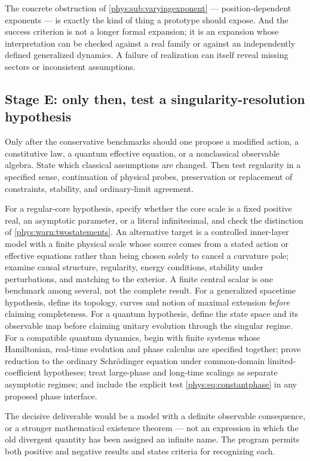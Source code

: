 \documentclass[11pt,letterpaper]{article}
\numberwithin{equation}{section}
\theoremstyle{definition}
\theoremstyle{remark}
\begin{document}
The concrete obstruction of \cref{phys:sub:varyingexponent} --- position-dependent
exponents --- is exactly the kind of thing a prototype should expose. And the
success criterion is not a longer formal expansion; it is an expansion whose
interpretation can be checked against a real family or against an independently
defined generalized dynamics. A failure of realization can itself reveal
missing sectors or inconsistent assumptions.

\subsection{Stage E: only then, test a singularity-resolution hypothesis}
\label{phys:sub:stageE}

Only after the conservative benchmarks should one propose a modified action, a
constitutive law, a quantum effective equation, or a nonclassical observable
algebra. State which classical assumptions are changed. Then test regularity in
a specified sense, continuation of physical probes, preservation or replacement
of constraints, stability, and ordinary-limit agreement.

For a regular-core hypothesis, specify whether the core scale is a fixed
positive real, an asymptotic parameter, or a literal infinitesimal, and check
the distinction of \cref{phys:warn:twostatements}. An alternative target is a
controlled inner-layer model with a finite physical scale whose source comes
from a stated action or effective equations rather than being chosen solely to
cancel a curvature pole; examine causal structure, regularity, energy
conditions, stability under perturbations, and matching to the exterior. A
finite central scalar is one benchmark among several, not the complete result.
For a generalized spacetime hypothesis, define its topology, curves and notion
of maximal extension \emph{before} claiming completeness. For a quantum
hypothesis, define the state space and its observable map before claiming
unitary evolution through the singular regime. For a compatible quantum
dynamics, begin with finite systems whose Hamiltonian, real-time evolution and
phase calculus are specified together; prove reduction to the ordinary
Schr\"odinger equation under common-domain limited-coefficient hypotheses;
treat large-phase and long-time scalings as separate asymptotic regimes; and
include the explicit test \eqref{phys:eq:constantphase} in any proposed phase
interface.

The decisive deliverable would be a model with a definite observable
consequence, or a stronger mathematical existence theorem --- not an expression
in which the old divergent quantity has been assigned an infinite name. The
program permits both positive and negative results and states criteria for
recognizing each.
\end{document}
